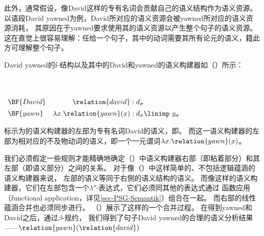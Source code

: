 此外，通常假设，像David这样的专有名词会贡献自己的语义结构作为语义资源。
以语段David yawned为例，David所对应的语义资源会被yawned所对应的语义资源消耗，
其原因在于yawned要求使用其\lfgsubj 的语义资源以产生整个句子的语义资源。
这在直觉上很容易理解：任给一个句子，其中的动词需要其所有论元的语义，籍此方可理解整个句子。
  
David yawned的f-结构以及其中的David和yawned的语义构建器如（）所示：

\eanoraggedright
 ~\\[-\baselineskip]
~\\[1em]
{$\begin{array}[t]{lr@{\;:\;}l}
\BF{David}&{\relation{david}}&{d_\sigma}\\*[1ex]
\BF{yawn}&{\lambda x. \relation{yawn}(x)}&{d_\sigma \linimp\ y_\sigma}
\end{array}$}
\z

\noindent 
标示为的语义构建器的左部为专有名词David的语义，即。
而\linebreak{}这一语义构建器的左部为相对应的不及物动词的语义，即一个一元谓词$\lambda x. \relation{yawn}(x)$。

我们必须假定一些规则才能精确地确定（）中语义构建器右部（即粘着部分）和其左部（即语义部分）之间的关系。
对于像（）中这样简单的、不包括逻辑蕴涵的语义构建器来说，
左部的语义等同于右侧的语义结构的语义。
而像这样的语义构建器，它们在左部包含一个$\lambda$"-表达式，它们必须同其他的表达式通过
函数应用（functional application，详见\ref{sec-PSG-Semantik}）组合在一起。
而右部的线性蕴涵合并也必须同步进行。
（）展示了这样的一个合并过程。
在得到yawned和David之后，通过$\beta$-规约，
我们得到了句子David yawned的合理的语义分析结果——$\relation{yawn}(\relation{david})$ 

